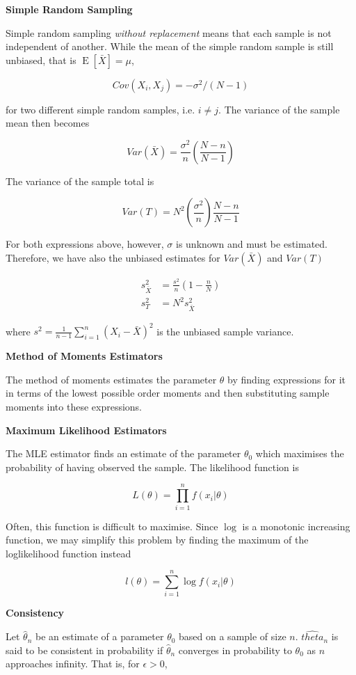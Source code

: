 \documentclass[a4paper]{article}
\newcommand{\subheading}[1]{{\scriptsize\textbf{#1}}}
\newcommand{\expectation}[1]{\operatorname{E}[#1]}
\begin{document}
\begin{multicols*}{4}
\subheading{Simple Random Sampling}

Simple random sampling \textit{without replacement} means that each sample is
not independent of another. While the mean of the simple random sample is still
unbiased, that is $\expectation{\bar{X}} = \mu$,

$$Cov(X_i, X_j) = -\sigma^2 / (N-1)$$

for two different simple random samples, i.e. $i \neq j$. The variance of the
sample mean then becomes

$$Var(\bar{X}) = \frac{\sigma^2}{n} \left ( \frac{N - n}{N - 1} \right )$$

The variance of the sample total is

$$Var(T) = N^2 \left ( \frac{\sigma^2}{n} \right ) \frac{N- n}{N-1}$$

For both expressions above, however, $\sigma$ is unknown and must be estimated.
Therefore, we have also the unbiased estimates for $Var(\bar{X})$ and $Var(T)$

\begin{align*}
  s^2_{\bar{X}} &= \frac{s^2}{n} \left ( 1 - \frac{n}{N} \right ) \\
  s^2_T &= N^2 s^2_{\bar{X}}
\end{align*}

where $s^2 = \frac{1}{n-1}\sum^n_{i=1}(X_i - \bar{X})^2$ is the unbiased sample
variance. \smallskip

\subheading{Method of Moments Estimators}

The method of moments estimates the parameter $\theta$ by finding expressions
for it in terms of the lowest possible order moments and then substituting
sample moments into these expressions. \smallskip

\subheading{Maximum Likelihood Estimators}

The MLE estimator finds an estimate of the parameter $\theta_0$ which maximises
the probability of having observed the sample. The likelihood function is

$$L(\theta) = \prod^n_{i=1} f(x_i|\theta)$$

Often, this function is difficult to maximise. Since $\log$ is a monotonic
increasing function, we may simplify this problem by finding the maximum of the
loglikelihood function instead

$$l(\theta) = \sum^n_{i=1} \log f(x_i|\theta)$$

\subheading{Consistency}

Let $\hat{\theta}_n$ be an estimate of a parameter $\theta_0$ based on a sample
of size $n$. $\hat{theta}_n$ is said to be consistent in probability if
$\hat{\theta}_n$ converges in probability to $\theta_0$ as $n$ approaches
infinity. That is, for $\epsilon > 0$,


\end{multicols*}
\end{document}
